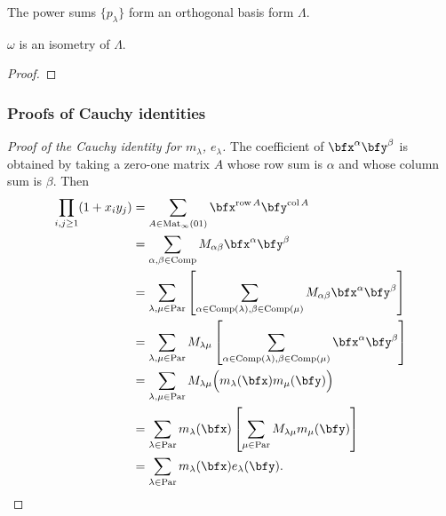 \documentclass{article}
\DeclareMathOperator{\row}{row}
\DeclareMathOperator{\col}{col}
\DeclareMathOperator{\Par}{Par}
\DeclareMathOperator{\Com}{Comp}
\DeclareMathOperator{\Mat}{Mat}
\begin{document}
\begin{corollary}
    The power sums $\{p_\lambda\}$ form an orthogonal basis form $\Lambda$.
\end{corollary}

\begin{theorem}
    $\omega$ is an isometry of $\Lambda$.
\end{theorem}
\begin{proof}
\end{proof}

\subsubsection{Proofs of Cauchy identities}

\begin{proof}
    [Proof of the Cauchy identity for $m_\lambda$, $e_\lambda$]
    The coefficient of $\bfx^\alpha \bfy^\beta$ is obtained by taking a zero-one matrix $A$ whose row sum is $\alpha$ and whose column sum is $\beta$. Then
    \begin{align*}
        \prod_{i,j\geq1}(1+x_iy_j)
        &=
        \sum_{A \in \Mat_\infty(01)}
        \bfx^{\row A}\bfy^{\col A} \\
        &=
        \sum_{\alpha,\beta \in \Com}
        M_{\alpha\beta}\bfx^\alpha \bfy^\beta \\
        &=
        \sum_{\lambda,\mu\in\Par}
        \left[
            \sum_{\alpha \in \Com(\lambda), \beta \in \Com(\mu)}
            M_{\alpha\beta} \bfx^\alpha \bfy^\beta
        \right] \\
        &=
        \sum_{\lambda,\mu\in\Par}
        M_{\lambda\mu}
        \left[
            \sum_{\alpha \in \Com(\lambda), \beta \in \Com(\mu)}
            \bfx^\alpha \bfy^\beta
        \right] \\
        &=
        \sum_{\lambda,\mu \in \Par}
        M_{\lambda\mu}
        \Big(
            m_\lambda(\bfx) m_\mu(\bfy)
        \Big) \\
        &=
        \sum_{\lambda \in \Par}
        m_\lambda(\bfx)
        \left[
            \sum_{\mu\in\Par}
            M_{\lambda\mu} m_\mu(\bfy)
        \right] \\
        &=
        \sum_{\lambda \in \Par}
        m_\lambda(\bfx) e_\lambda(\bfy).
    \end{align*}
\end{proof}
\end{document}
